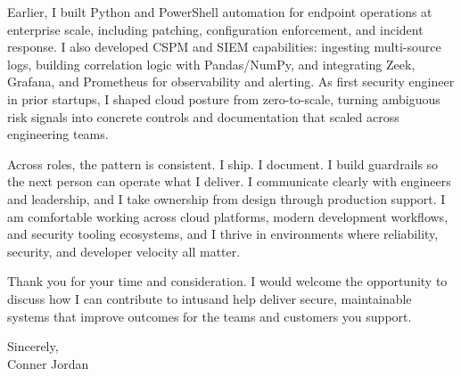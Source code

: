 \documentclass[letterpaper,11pt]{article}
\newcommand{\companyname}{intus}
\begin{document}
\vspace{16pt}

Earlier, I built Python and PowerShell automation for endpoint operations at enterprise scale, including patching, configuration enforcement, and incident response. I also developed CSPM and SIEM capabilities: ingesting multi-source logs, building correlation logic with Pandas/NumPy, and integrating Zeek, Grafana, and Prometheus for observability and alerting. As first security engineer in prior startups, I shaped cloud posture from zero-to-scale, turning ambiguous risk signals into concrete controls and documentation that scaled across engineering teams.

\vspace{16pt}

Across roles, the pattern is consistent. I ship. I document. I build guardrails so the next person can operate what I deliver. I communicate clearly with engineers and leadership, and I take ownership from design through production support. I am comfortable working across cloud platforms, modern development workflows, and security tooling ecosystems, and I thrive in environments where reliability, security, and developer velocity all matter.

\vspace{16pt}

Thank you for your time and consideration. I would welcome the opportunity to discuss how I can contribute to \companyname and help deliver secure, maintainable systems that improve outcomes for the teams and customers you support.

\vspace{16pt}

Sincerely,\\
Conner Jordan
\end{document}
